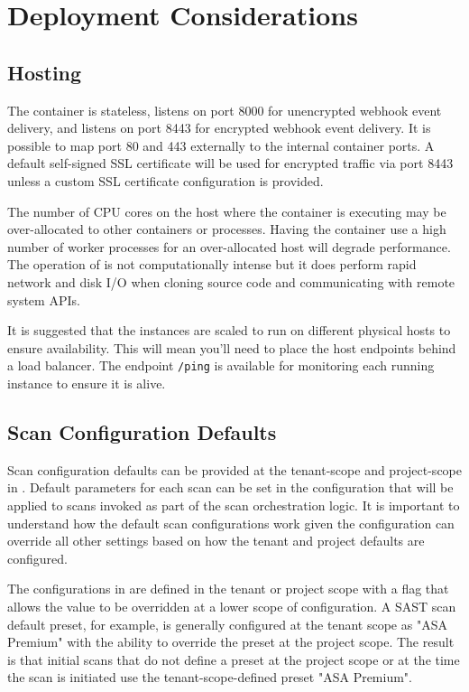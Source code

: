 \section{Deployment Considerations}

\subsection{Hosting}

The \cxoneflow container is stateless, listens on port 8000 for unencrypted webhook event delivery, 
and listens on port 8443 for encrypted webhook event delivery.  It is possible to map port 80 and 443
externally to the internal container ports.  A default self-signed SSL certificate will be used
for encrypted traffic via port 8443 unless a custom SSL certificate configuration is provided.  

The number of CPU cores on the host where the container is executing may be over-allocated to other
containers or processes.  Having the container use a high number of worker processes for an over-allocated
host will degrade performance.  The operation of \cxoneflow is not computationally intense
but it does perform rapid network and disk I/O when cloning source code and communicating with
remote system APIs.

It is suggested that the \cxoneflow instances are scaled to run on different physical hosts to
ensure availability.  This will mean you'll need to place the \cxoneflow host endpoints behind 
a load balancer.  The \cxoneflow endpoint \texttt{/ping} is available for monitoring each
running instance to ensure it is alive.

\subsection{Scan Configuration Defaults}\label{sec:deployment-scan-defaults}

Scan configuration defaults can be provided at the tenant-scope and project-scope
in \cxone.  Default parameters for each scan can be set in the \cxoneflow configuration
that will be applied to scans invoked as part of the \cxoneflow scan orchestration logic.
It is important to understand how the \cxone default
scan configurations work given the \cxoneflow configuration can override all other
settings based on how the tenant and project defaults are configured.

The configurations in \cxone are defined in the tenant or project scope with a
flag that allows the value to be overridden at a lower scope of configuration.  A
SAST scan default preset, for example, is generally configured at the tenant scope
as "ASA Premium" with the ability to override the preset at the project scope.  The
result is that initial scans that do not define a preset at the project scope or
at the time the scan is initiated use the tenant-scope-defined preset "ASA Premium".

